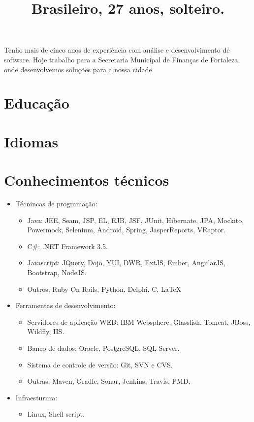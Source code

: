\documentclass[12pt,a4paper]{moderncv}
\title{\small Brasileiro, 27 anos, solteiro.}
\begin{document}
\makecvtitle

Tenho mais de cinco anos de experiência com análise e desenvolvimento de software. Hoje trabalho para a Secretaria Municipal de Finanças de Fortaleza, onde desenvolvemos soluções para a nossa cidade.

\section{Educação}

\section{Idiomas}

\section{Conhecimentos técnicos}
\begin{itemize}
\item Técnincas de programação:
  \begin{itemize}
  \item Java: JEE, Seam, JSP, EL, EJB, JSF, JUnit, Hibernate, JPA, Mockito, Powermock, Selenium, Android, Spring, JasperReports, VRaptor.
  \item C\#: .NET Framework 3.5.
  \item Javascript: JQuery, Dojo, YUI, DWR, ExtJS, Ember, AngularJS, Bootstrap, NodeJS.
  \item Outros: Ruby On Rails, Python, Delphi, C, \LaTeX\
  \end{itemize}
\item Ferramentas de desenvolvimento:
   \begin{itemize}
      \item Servidores de aplicação WEB: IBM Websphere, Glassfish, Tomcat, JBoss, Wildfly, IIS.
      \item Banco de dados: Oracle, PostgreSQL, SQL Server.
      \item Sistema de controle de versão: Git, SVN e CVS.
      \item Outras: Maven, Gradle, Sonar, Jenkins, Travis, PMD.
   \end{itemize}
\item Infraesturura:
   \begin{itemize}
         \item Linux, Shell script.
   \end{itemize}
\end{itemize}
\end{document}
